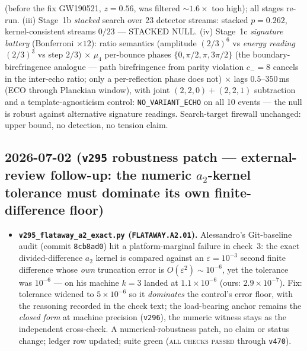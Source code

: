 \begin{itemize}[leftmargin=1.5em]
(before the fix GW190521, $z{=}0.56$, was filtered ${\sim}1.6\times$ too high); all stages re-run.
(iii) Stage~1b \emph{stacked} search over 23 detector streams: stacked $p{=}0.262$, kernel-consistent
streams $0/23$ --- STACKED NULL. (iv) Stage~1c \emph{signature battery} (Bonferroni $\times12$): ratio
semantics (amplitude $(2/3)^6$ vs \emph{energy reading} $(2/3)^3$ vs step $2/3$) $\times$ $\mu_4$
per-bounce phases $\{0,\pi/2,\pi,3\pi/2\}$ (the boundary-birefringence analogue --- path birefringence
from parity violation $c_-{=}8$ cancels in the inter-echo ratio; only a per-reflection phase does not)
$\times$ lags $0.5$--$350$\,ms (ECO through Planckian window), with joint $(2,2,0){+}(2,2,1)$ subtraction
and a template-agnosticism control: \texttt{NO\_VARIANT\_ECHO} on all 10 events --- the null is robust
against alternative signature readings. Search-target firewall unchanged: upper bound, no detection, no
tension claim.
\end{itemize}

\subsection*{2026-07-02 (\texttt{v295} robustness patch --- external-review follow-up: the numeric $a_2$-kernel tolerance must dominate its own finite-difference floor)}
\begin{itemize}
\item \textbf{\texttt{v295\_flataway\_a2\_exact.py} (\texttt{FLATAWAY.A2.01}).} Alessandro's Git-baseline audit
(commit \texttt{8cb8ad0}) hit a platform-marginal failure in check~3: the exact divided-difference $a_2$ kernel
is compared against an $\varepsilon{=}10^{-3}$ second finite difference whose \emph{own} truncation error is
$O(\varepsilon^2)\sim10^{-6}$, yet the tolerance was $10^{-6}$ --- on his machine $k{=}3$ landed at
$1.1\times10^{-6}$ (ours: $2.9\times10^{-7}$). Fix: tolerance widened to $5\times10^{-6}$ so it \emph{dominates}
the control's error floor, with the reasoning recorded in the check text; the load-bearing anchor remains the
\emph{closed form} at machine precision (\texttt{v296}), the numeric witness stays as the independent
cross-check. A numerical-robustness patch, no claim or status change; ledger row updated; suite green
(\textsc{all checks passed} through \texttt{v470}).
\end{itemize}

